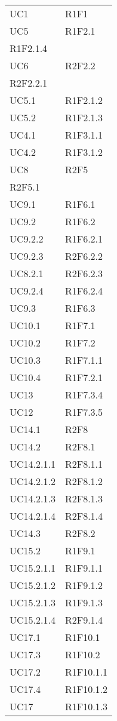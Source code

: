 \begin{longtable}{|C{6.5cm}|C{6.5cm}|}
	\tabularnewline

	UC1 & R1F1 \\
	UC5 & \centering R1F2.1 \\ R1F2.1.4 \tabularnewline
	UC6 & \centering R2F2.2 \\ R2F2.2.1 \tabularnewline
	UC5.1 & R1F2.1.2 \\
	UC5.2 & R1F2.1.3 \\
	UC4.1 & R1F3.1.1 \\
	UC4.2 & R1F3.1.2 \\
	UC8 & \centering R2F5 \\ R2F5.1 \tabularnewline
	UC9.1 & R1F6.1 \\
    UC9.2 & R1F6.2 \\
    UC9.2.2 & R1F6.2.1 \\
    UC9.2.3 & R2F6.2.2 \\
    UC8.2.1 & R2F6.2.3 \\
    UC9.2.4 & R1F6.2.4 \\
	UC9.3 & R1F6.3 \\
	UC10.1 & R1F7.1 \\
	UC10.2 & R1F7.2 \\
	UC10.3 & R1F7.1.1 \\
	UC10.4 & R1F7.2.1 \\
	UC13 & R1F7.3.4 \\
	UC12 & R1F7.3.5 \\
	UC14.1 & R2F8 \\
	UC14.2 & R2F8.1 \\
	UC14.2.1.1 & R2F8.1.1 \\
	UC14.2.1.2 & R2F8.1.2 \\
	UC14.2.1.3 & R2F8.1.3 \\
	UC14.2.1.4 & R2F8.1.4 \\
	UC14.3 & R2F8.2 \\
	UC15.2 & R1F9.1 \\
	UC15.2.1.1 & R1F9.1.1 \\
	UC15.2.1.2 & R1F9.1.2 \\
	UC15.2.1.3 & R1F9.1.3 \\
	UC15.2.1.4 & R2F9.1.4 \\
	UC17.1 & R1F10.1 \\
	UC17.3 & R1F10.2 \\
	UC17.2 & R1F10.1.1 \\
	UC17.4 & R1F10.1.2 \\
	UC17 & R1F10.1.3 \\

\end{longtable}
